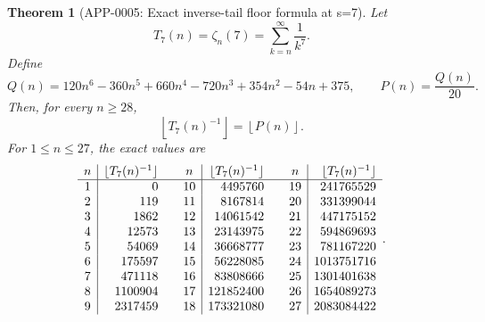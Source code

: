 \documentclass[11pt]{article}
\numberwithin{equation}{section}
\newtheorem{theorem}{Theorem}[section]
\theoremstyle{definition}
\theoremstyle{remark}
\newcommand{\1}{\mathbf 1}
\begin{document}
\begin{theorem}[APP-0005: Exact inverse-tail floor formula at s=7]
\label{thm:tail-s7-floor}
Let
\begin{equation}
\label{eq:tail-s7}
T_7(n)=\zeta_n(7)=\sum_{k=n}^{\infty}\frac1{k^7}.
\end{equation}
Define
\begin{equation}
\label{eq:tail-s7-q}
Q(n)=120n^6-360n^5+660n^4-720n^3+354n^2-54n+375,
\qquad
P(n)=\frac{Q(n)}{20}.
\end{equation}
Then, for every \(n\ge28\),
\begin{equation}
\label{eq:tail-s7-floor}
\left\lfloor T_7(n)^{-1}\right\rfloor=\left\lfloor P(n)\right\rfloor.
\end{equation}
For \(1\le n\le27\), the exact values are
\begin{equation}
\label{eq:tail-s7-finite-table}
\begin{array}{c|r@{\qquad}c|r@{\qquad}c|r}
n&\lfloor T_7(n)^{-1}\rfloor&n&\lfloor T_7(n)^{-1}\rfloor&n&\lfloor T_7(n)^{-1}\rfloor\\
\hline
1&0&10&4495760&19&241765529\\
2&119&11&8167814&20&331399044\\
3&1862&12&14061542&21&447175152\\
4&12573&13&23143975&22&594869693\\
5&54069&14&36668777&23&781167220\\
6&175597&15&56228085&24&1013751716\\
7&471118&16&83808666&25&1301401638\\
8&1100904&17&121852400&26&1654089273\\
9&2317459&18&173321080&27&2083084422
\end{array}.
\end{equation}
\end{theorem}
\end{document}
